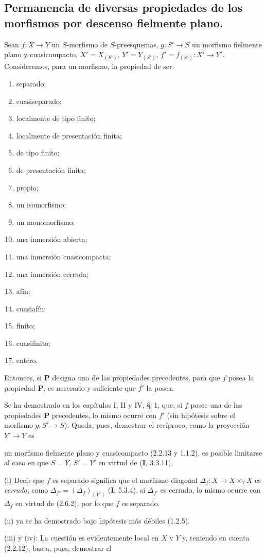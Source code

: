 \subsection{Permanencia de diversas propiedades de los morfismos por descenso
fielmente plano.}
\label{subsection:IV.2.7-fr}

\begin{proposition}[2.7.1]
\label{IV.2.7.1-fr}
Sean $f:X\to Y$ un $S$-morfismo de $S$-preesquemas, $g:S'\to S$ un
morfismo fielmente plano y cuasicompacto, $X'=X_{(S')}$, $Y'=Y_{(S')}$,
$f'=f_{(S')}:X'\to Y'$. Consideremos, para un morfismo, la propiedad de ser:
\begin{enumerate}
\item[\textup{(i)}] separado;
\item[\textup{(ii)}] cuasiseparado;
\item[\textup{(iii)}] localmente de tipo finito;
\item[\textup{(iv)}] localmente de presentación finita;
\item[\textup{(v)}] de tipo finito;
\item[\textup{(vi)}] de presentación finita;
\item[\textup{(vii)}] propio;
\item[\textup{(viii)}] un isomorfismo;
\item[\textup{(ix)}] un monomorfismo;
\item[\textup{(x)}] una inmersión abierta;
\item[\textup{(xi)}] una inmersión cuasicompacta;
\item[\textup{(xii)}] una inmersión cerrada;
\item[\textup{(xiii)}] afín;
\item[\textup{(xiv)}] cuasiafín;
\item[\textup{(xv)}] finito;
\item[\textup{(xvi)}] cuasifinito;
\item[\textup{(xvii)}] entero.
\end{enumerate}
Entonces, si $\boldsymbol{P}$ designa una de las propiedades precedentes, para que $f$
posea la propiedad $\boldsymbol{P}$, es necesario y suficiente que $f'$ la posea.
\end{proposition}

Se ha demostrado en los capítulos I, II y IV, \S~1, que, si $f$ posee una de
las propiedades $\boldsymbol{P}$ precedentes, lo mismo
ocurre con $f'$ (sin hipótesis sobre el morfismo $g:S'\to S$). Queda, pues,
demostrar el recíproco; como la proyección $Y'\to Y$ es

un morfismo fielmente plano y cuasicompacto (2.2.13 y 1.1.2), es posible
limitarse al caso en que $S=Y$, $S'=Y'$ en virtud de (\textbf I, 3.3.11).

(i) Decir que $f$ es separado significa que el morfismo diagonal
$\Delta_f:X\to X\times_Y X$ es \emph{cerrado}; como
$\Delta_{f'}=(\Delta_f)_{(Y')}$ (\textbf I, 5.3.4), si $\Delta_{f'}$ es cerrado, lo
mismo ocurre con $\Delta_f$ en virtud de (2.6.2), por lo que $f$ es separado.

(ii) ya se ha demostrado bajo hipótesis más débiles (1.2.5).

(iii) y (iv): La cuestión es evidentemente local en $X$ y
$Y$ y, teniendo en cuenta (2.2.12), basta, pues, demostrar el
